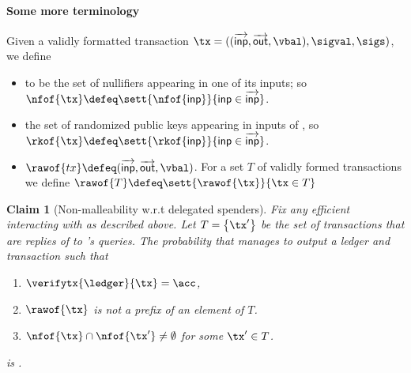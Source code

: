 \documentclass[11pt]{article}
\numberwithin{equation}{section} %
\numberwithin{figure}{section} %
\newtheorem{claim}[thm]{Claim}
\newcommand{\inp}{\ensuremath{\mathsf{inp}}\xspace}
\newcommand{\inps}{\ensuremath{\overrightarrow{\mathsf{inp}}}\xspace}
\newcommand{\outs}{\ensuremath{\overrightarrow{\mathsf{out}}}\xspace}
\newcommand{\set}[1]{\ensuremath{\left\{#1\right\}}\xspace}
\begin{document}
\paragraph{Some more terminology}
Given a validly formatted transaction $\tx=((\inps,\outs,\vbal), \sigval,\sigs)$,
we define 
\begin{itemize}
 \item \nfof{\tx} to be the set of nullifiers appearing in one of its inputs; so $\nfof{\tx}\defeq \sett{\nfof{\inp}}{\inp\in\inps}$.
\item \rkof{\tx} the set of randomized public keys appearing in inputs of \tx, so $\rkof{\tx}\defeq \sett{\rkof{\inp}}{\inp\in\inps}$.
\item $\rawof{tx}\defeq (\inps,\outs,\vbal)$. For a set $T$ of validly formed transactions we define $\rawof{T}\defeq \sett{\rawof{\tx}}{\tx\in T}$
\end{itemize}
\begin{claim}[Non-malleability w.r.t delegated spenders]\label{clm:nmal-sapling}
Fix any efficient \adv interacting with \oracle as described above.
Let $T=\set{\tx'}$ be the set of transactions that are replies of \oracle to \adv's \signallinputs queries.
The probability that \adv manages to output a ledger \ledger and transaction \tx such that

\begin{enumerate}
 \item	$\verifytx{\ledger}{\tx}=\acc$,
 \item  $\rawof{\tx}$ is not a prefix of an element of $T$.
 \item $\nfof{\tx} \cap \nfof{\tx'}\neq \emptyset$ for some  $\tx'\in T$.
\end{enumerate}
is \negl. 
\end{claim}
\end{document}
